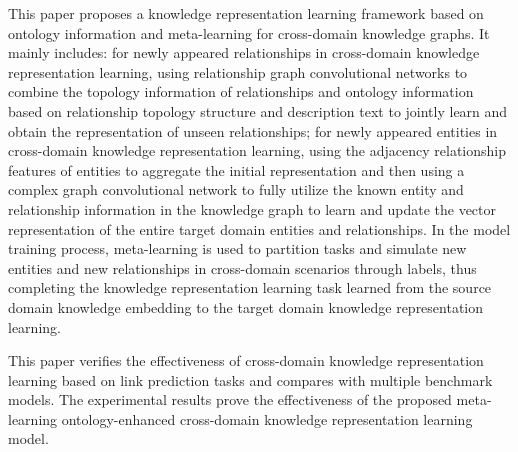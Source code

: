 This paper proposes a knowledge representation learning framework based on ontology information and meta-learning for cross-domain knowledge graphs. It mainly includes: for newly appeared relationships in cross-domain knowledge representation learning, using relationship graph convolutional networks to combine the topology information of relationships and ontology information based on relationship topology structure and description text to jointly learn and obtain the representation of unseen relationships; for newly appeared entities in cross-domain knowledge representation learning, using the adjacency relationship features of entities to aggregate the initial representation and then using a complex graph convolutional network to fully utilize the known entity and relationship information in the knowledge graph to learn and update the vector representation of the entire target domain entities and relationships. In the model training process, meta-learning is used to partition tasks and simulate new entities and new relationships in cross-domain scenarios through labels, thus completing the knowledge representation learning task learned from the source domain knowledge embedding to the target domain knowledge representation learning.

This paper verifies the effectiveness of cross-domain knowledge representation learning based on link prediction tasks and compares with multiple benchmark models. The experimental results prove the effectiveness of the proposed meta-learning ontology-enhanced cross-domain knowledge representation learning model.